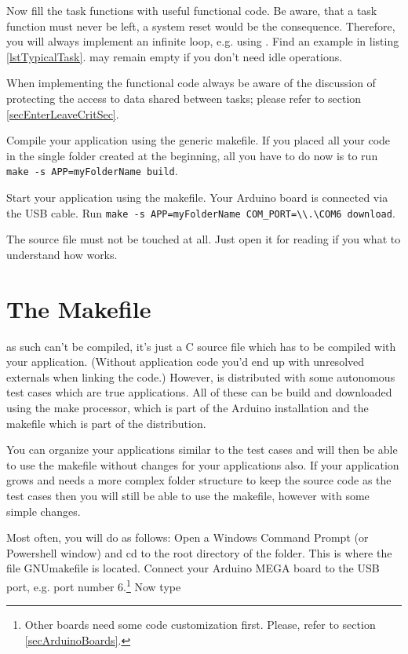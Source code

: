 Now fill the task functions with useful functional code. Be aware,
that a task function must never be left, a system reset would be the
consequence. Therefore, you will always implement an infinite loop, e.g.
using . Find an example in listing
\ref{lstTypicalTask}.  may remain empty if you don't need idle
operations.

When implementing the functional code always be aware of the discussion of
protecting the access to data shared between tasks; please refer to
section \ref{secEnterLeaveCritSec}.

Compile your application using the generic makefile. If you placed all
your code in the single folder created at the beginning, all you have to
do now is to run \verb+make -s APP=myFolderName build+.

Start your application using the makefile. Your Arduino board is connected
via the USB cable. Run 
\verb+make -s APP=myFolderName COM_PORT=\\.\COM6 download+.

The \rtos{} source file  must not be touched at all. Just open
it for reading if you what to understand how \rtos{} works.


\section{The Makefile}
\label{secMakefile}

\rtos{} as such can't be compiled, it's just a C source file which has to
be compiled with your application. (Without application code you'd end up
with unresolved externals when linking the code.) However, \rtos{} is
distributed with some autonomous test cases which are true \rtos{}
applications. All of these can be build and downloaded using the make
processor, which is part of the Arduino installation and the makefile
which is part of the \rtos{} distribution.

You can organize your applications similar to the test cases and will then
be able to use the makefile without changes for your applications also. If
your application grows and needs a more complex folder structure to keep
the source code as the test cases then you will still be able to use the
makefile, however with some simple changes.

Most often, you will do as follows: Open a Windows Command Prompt (or
Powershell window) and cd to the root directory of the \rtos{} folder.
This is where the file GNUmakefile is located. Connect your Arduino MEGA
board to the USB port, e.g. port number 6.\footnote{Other boards need some
code customization first. Please, refer to section
\ref{secArduinoBoards}.} Now type

